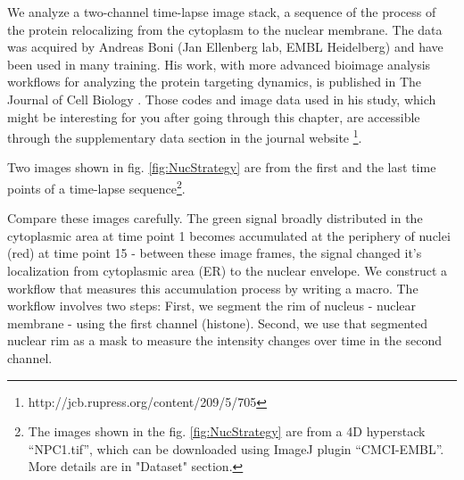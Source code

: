  We analyze a two-channel time-lapse image stack, a sequence of the process of the protein relocalizing from the cytoplasm to the nuclear membrane.  The data was acquired by Andreas Boni (Jan Ellenberg lab, EMBL Heidelberg) and have been used in many training. His work, with more advanced bioimage analysis workflows for analyzing the protein targeting dynamics, is published in The Journal of Cell Biology \citep{Boni2015}. Those codes and image data used in his study, which might be interesting for you after going through this chapter, are accessible through the supplementary data section in the journal website \footnote{http://jcb.rupress.org/content/209/5/705}. 
 
 Two images shown in fig. \ref{fig:NucStrategy} are from the first and the last time points of a time-lapse sequence\footnote{The images shown in the fig. \ref{fig:NucStrategy} are from a 4D hyperstack ``NPC1.tif'', which can be downloaded using ImageJ plugin ``CMCI-EMBL''. More details are in "Dataset" section.}. 

Compare these images carefully. The green signal broadly distributed in the cytoplasmic area at time point 1 becomes accumulated at the periphery of nuclei (red) at time point 15 - between these image frames, the signal changed it's localization from cytoplasmic area (ER) to the nuclear envelope. We construct a workflow that measures this accumulation process by writing a macro. The workflow involves two steps: First, we segment the rim of nucleus - nuclear membrane - using the first channel (histone). Second, we use that segmented nuclear rim as a mask to measure the intensity changes over time in the second channel. 

